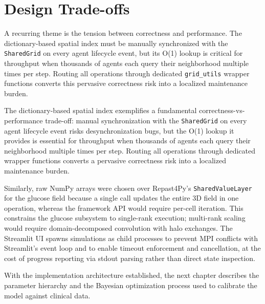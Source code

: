 \section{Design Trade-offs}
\label{sec:design-tradeoffs}

A recurring theme is the tension between correctness and performance. The dictionary-based spatial index must be manually synchronized with the \texttt{SharedGrid} on every agent lifecycle event, but its O(1) lookup is critical for throughput when thousands of agents each query their neighborhood multiple times per step. Routing all operations through dedicated \texttt{grid\_utils} wrapper functions converts this pervasive correctness risk into a localized maintenance burden.

\begin{keyinsight}
The dictionary-based spatial index exemplifies a fundamental correctness-vs-performance trade-off: manual synchronization with the \texttt{SharedGrid} on every agent lifecycle event risks desynchronization bugs, but the O(1) lookup it provides is essential for throughput when thousands of agents each query their neighborhood multiple times per step. Routing all operations through dedicated wrapper functions converts a pervasive correctness risk into a localized maintenance burden.
\end{keyinsight}

Similarly, raw NumPy arrays were chosen over Repast4Py's \texttt{Shared\-Value\-Layer} for the glucose field because a single  call updates the entire 3D field in one operation, whereas the framework API would require per-cell iteration. This constrains the glucose subsystem to single-rank execution; multi-rank scaling would require domain-decomposed convolution with halo exchanges. The Streamlit UI spawns simulations as child processes to prevent MPI conflicts with Streamlit's event loop and to enable timeout enforcement and cancellation, at the cost of progress reporting via stdout parsing rather than direct state inspection.

With the implementation architecture established, the next chapter describes the parameter hierarchy and the Bayesian optimization process used to calibrate the model against clinical data.
